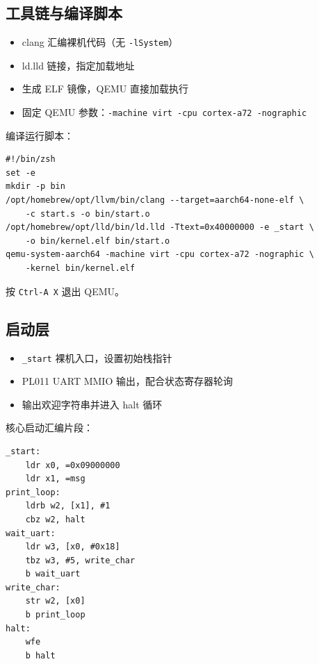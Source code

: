 
\subsection{工具链与编译脚本}

\begin{itemize}
    \item clang 汇编裸机代码（无 \texttt{-lSystem}）
    \item ld.lld 链接，指定加载地址
    \item 生成 ELF 镜像，QEMU 直接加载执行
    \item 固定 QEMU 参数：\texttt{-machine virt -cpu cortex-a72 -nographic}
\end{itemize}

编译运行脚本：

\begin{verbatim}
#!/bin/zsh
set -e
mkdir -p bin
/opt/homebrew/opt/llvm/bin/clang --target=aarch64-none-elf \
    -c start.s -o bin/start.o
/opt/homebrew/opt/lld/bin/ld.lld -Ttext=0x40000000 -e _start \
    -o bin/kernel.elf bin/start.o
qemu-system-aarch64 -machine virt -cpu cortex-a72 -nographic \
    -kernel bin/kernel.elf
\end{verbatim}

按 \texttt{Ctrl-A X} 退出 QEMU。

\subsection{启动层}

\begin{itemize}
    \item \texttt{\_start} 裸机入口，设置初始栈指针
    \item PL011 UART MMIO 输出，配合状态寄存器轮询
    \item 输出欢迎字符串并进入 halt 循环
\end{itemize}

核心启动汇编片段：

\begin{verbatim}
_start:
    ldr x0, =0x09000000
    ldr x1, =msg
print_loop:
    ldrb w2, [x1], #1
    cbz w2, halt
wait_uart:
    ldr w3, [x0, #0x18]
    tbz w3, #5, write_char
    b wait_uart
write_char:
    str w2, [x0]
    b print_loop
halt:
    wfe
    b halt
\end{verbatim}
